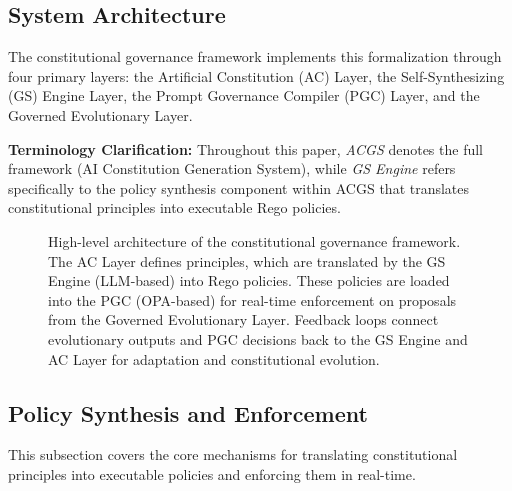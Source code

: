\documentclass[sigconf,natbib]{acmart}
\begin{document}
\subsection{System Architecture}
\label{subsec:system_architecture}

The constitutional governance framework implements this formalization through four primary layers: the Artificial Constitution (AC) Layer, the Self-Synthesizing (GS) Engine Layer, the Prompt Governance Compiler (PGC) Layer, and the Governed Evolutionary Layer.

\textbf{Terminology Clarification:} Throughout this paper, \textit{ACGS} denotes the full framework (AI Constitution Generation System), while \textit{GS Engine} refers specifically to the policy synthesis component within ACGS that translates constitutional principles into executable Rego policies.

\begin{figure}[htbp]
  \centering
  \caption[High-level architecture diagram]{High-level architecture of the constitutional governance framework. The AC Layer defines principles, which are translated by the GS Engine (LLM-based) into Rego policies. These policies are loaded into the PGC (OPA-based) for real-time enforcement on proposals from the Governed Evolutionary Layer. Feedback loops connect evolutionary outputs and PGC decisions back to the GS Engine and AC Layer for adaptation and constitutional evolution.}
  \label{fig:architecture}
\end{figure}

\subsection{Policy Synthesis and Enforcement}
\label{subsec:policy_synthesis_enforcement}

This subsection covers the core mechanisms for translating constitutional principles into executable policies and enforcing them in real-time.
\end{document}
